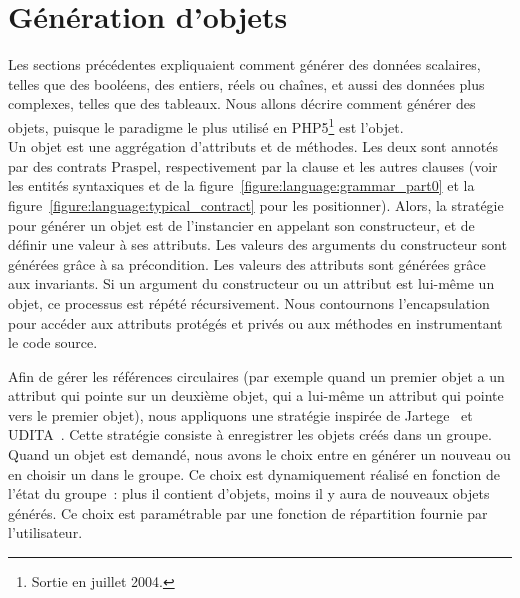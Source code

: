 \section{Génération d'objets}
\label{section:data:objects}

Les sections précédentes expliquaient comment générer des données scalaires,
telles que des booléens, des entiers, réels ou chaînes, et aussi des données
plus complexes, telles que des tableaux. Nous allons décrire comment générer des
objets, puisque le paradigme le plus utilisé en PHP5\footnote{Sortie en juillet
2004.} est l'objet. \\

Un objet est une aggrégation d'attributs et de méthodes. Les deux sont annotés
par des contrats Praspel, respectivement par la clause \ainvariant et les autres
clauses (voir les entités syntaxiques  et
 de la figure~\ref{figure:language:grammar_part0} et la
figure~\ref{figure:language:typical_contract} pour les positionner). Alors, la
stratégie pour générer un objet est de l'instancier en appelant son
constructeur, et de définir une valeur à ses attributs. Les valeurs des
arguments du constructeur sont générées grâce à sa précondition. Les valeurs des
attributs sont générées grâce aux invariants. Si un argument du constructeur ou
un attribut est lui-même un objet, ce processus est répété récursivement. Nous
contournons l'encapsulation pour accéder aux attributs protégés et privés ou aux
méthodes en instrumentant le code source.

Afin de gérer les références circulaires (par exemple quand un premier objet a
un attribut qui pointe sur un deuxième objet, qui a lui-même un attribut qui
pointe vers le premier objet), nous appliquons une stratégie inspirée de
Jartege~ et UDITA~. Cette stratégie
consiste à enregistrer les objets créés dans un groupe. Quand un objet est
demandé, nous avons le choix entre en générer un nouveau ou en choisir un dans
le groupe. Ce choix est dynamiquement réalisé en fonction de l'état du groupe~:
plus il contient d'objets, moins il y aura de nouveaux objets générés. Ce choix
est paramétrable par une fonction de répartition fournie par l'utilisateur.
